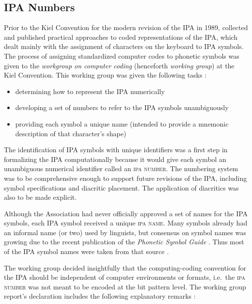 \subsection*{IPA Numbers}
Prior to the Kiel Convention for the modern revision of the IPA in 1989,
\citet{Wells1987} collected and published practical approaches to coded
representations of the IPA, which dealt mainly with the assignment of characters
on the keyboard to IPA symbols. The process of assigning standardized computer
codes to phonetic symbols was given to the \textit{workgroup on computer
coding} (henceforth \textit{working group}) at the Kiel Convention. This working
group was given the following tasks
\citep{Esling1990,EslingGaylord1993}: 

\begin{itemize}
	\item determining how to represent the IPA numerically
	\item developing a set of numbers to refer to the IPA symbols unambiguously
	\item providing each symbol a unique name (intended to provide a mnemonic description of that character's shape)
\end{itemize}

\noindent The identification of IPA symbols with unique identifiers was 
a first step in formalizing the IPA computationally because it would give 
each symbol an unambiguous numerical identifier called an \textsc{ipa number}. 
The numbering system was to be comprehensive enough to support future revisions 
of the IPA, including symbol specifications and diacritic placement. The 
application of diacritics was also to be made explicit. 

Although the Association had never officially approved a set of names 
for the IPA symbols, each IPA symbol received a unique \textsc{ipa name}. 
Many symbols already had an informal name (or two) used by linguists, but 
consensus on symbol names was growing due to the recent publication of the 
\textit{Phonetic Symbol Guide} \citep{PullumLadusaw1986}. Thus most of the 
IPA symbol names were taken from that source \citep[31]{IPA1999}.

The working group decided insightfully that the computing-coding convention 
for the IPA should be independent of computer environments or formats, 
i.e.\ the \textsc{ipa number} was not meant to be encoded at the bit pattern level.
The working group report's declaration includes the following explanatory 
remarks \citep[82]{International1989report}:

